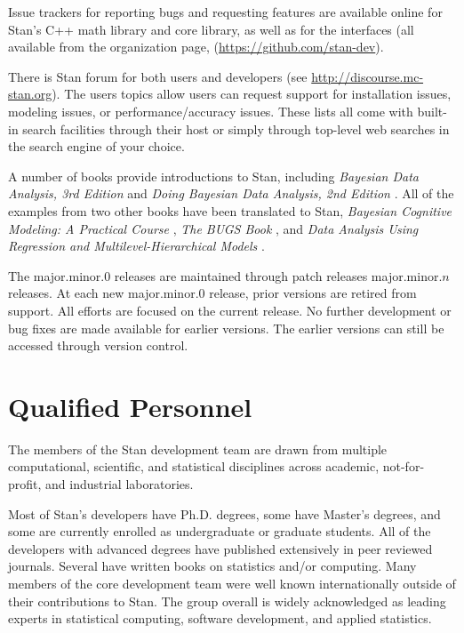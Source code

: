 Issue trackers for reporting bugs and requesting features are
available online for Stan's C++ math library and core library, as well
as for the interfaces (all available from the organization page,
(\url{https://github.com/stan-dev}).

There is Stan forum for both users and developers (see
\url{http://discourse.mc-stan.org}).  The users topics allow users can
request support for installation issues, modeling issues, or
performance/accuracy issues.  These lists all come with built-in
search facilities through their host or simply through top-level
web searches in the search engine of your choice.

A number of books provide introductions to Stan, including {\it
  Bayesian Data Analysis, 3rd Edition} \citep{GelmanEtAl:2013} and
{\it Doing Bayesian Data Analysis, 2nd Edition} \citep{Kruschke:2014}.
All of the examples from two other books have been translated to
Stan, {\it Bayesian Cognitive Modeling: A Practical Course}
\citep{LeeWagenmakers:2013}, {\it The BUGS Book}
\citep{LunnEtAl:2012}, and {\it Data Analysis Using Regression and
  Multilevel-Hierarchical Models} \citep{GelmanHill:2007}.

The major.minor.0 releases are maintained through patch releases
major.minor.$n$ releases.  At each new major.minor.0 release, prior
versions are retired from support.  All efforts are focused on the
current release.  No further development or bug fixes are made
available for earlier versions.  The earlier versions can still be
accessed through version control.


\section{Qualified Personnel}

The members of the Stan development team are drawn from multiple
computational, scientific, and statistical disciplines across
academic, not-for-profit, and industrial laboratories.

Most of Stan's developers have Ph.D. degrees, some have Master's
degrees, and some are currently enrolled as undergraduate or graduate
students. All of the developers with advanced degrees have published
extensively in peer reviewed journals. Several have written books on
statistics and/or computing. Many members of the core development team
were well known internationally outside of their contributions to Stan.
The group overall is widely acknowledged as leading experts in
statistical computing, software development, and applied statistics.

